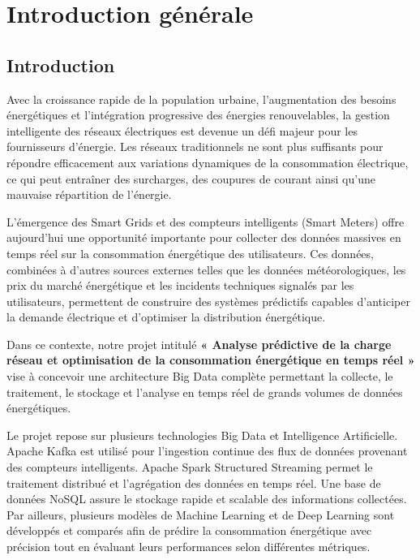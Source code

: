 \documentclass[1pt,a4paper]{report}
\begin{document}
\chapter{Introduction générale}

\section{Introduction}

Avec la croissance rapide de la population urbaine, l’augmentation des besoins énergétiques et l’intégration progressive des énergies renouvelables, la gestion intelligente des réseaux électriques est devenue un défi majeur pour les fournisseurs d’énergie. Les réseaux traditionnels ne sont plus suffisants pour répondre efficacement aux variations dynamiques de la consommation électrique, ce qui peut entraîner des surcharges, des coupures de courant ainsi qu’une mauvaise répartition de l’énergie.

L’émergence des Smart Grids et des compteurs intelligents (Smart Meters) offre aujourd’hui une opportunité importante pour collecter des données massives en temps réel sur la consommation énergétique des utilisateurs. Ces données, combinées à d’autres sources externes telles que les données météorologiques, les prix du marché énergétique et les incidents techniques signalés par les utilisateurs, permettent de construire des systèmes prédictifs capables d’anticiper la demande électrique et d’optimiser la distribution énergétique.

Dans ce contexte, notre projet intitulé \textbf{« Analyse prédictive de la charge réseau et optimisation de la consommation énergétique en temps réel »} vise à concevoir une architecture Big Data complète permettant la collecte, le traitement, le stockage et l’analyse en temps réel de grands volumes de données énergétiques.

Le projet repose sur plusieurs technologies Big Data et Intelligence Artificielle. Apache Kafka est utilisé pour l’ingestion continue des flux de données provenant des compteurs intelligents. Apache Spark Structured Streaming permet le traitement distribué et l’agrégation des données en temps réel. Une base de données NoSQL assure le stockage rapide et scalable des informations collectées. Par ailleurs, plusieurs modèles de Machine Learning et de Deep Learning sont développés et comparés afin de prédire la consommation énergétique avec précision tout en évaluant leurs performances selon différentes métriques.
\end{document}
